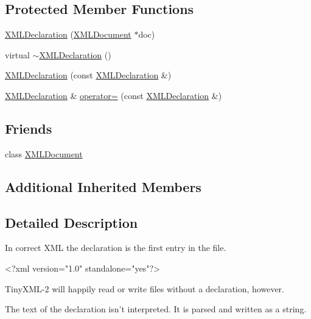\subsection*{Protected Member Functions}
\begin{DoxyCompactItemize}
\item 
\hyperlink{classtinyxml2_1_1_x_m_l_declaration_aef9586f2ce5df5feba74dde49a242b06}{X\-M\-L\-Declaration} (\hyperlink{classtinyxml2_1_1_x_m_l_document}{X\-M\-L\-Document} $\ast$doc)
\item 
virtual \hyperlink{classtinyxml2_1_1_x_m_l_declaration_ab93d5bf4f5d58b4144963cf739cf6dcc}{$\sim$\-X\-M\-L\-Declaration} ()
\item 
\hyperlink{classtinyxml2_1_1_x_m_l_declaration_a5229cc0b31f034f93289af27ec3e2836}{X\-M\-L\-Declaration} (const \hyperlink{classtinyxml2_1_1_x_m_l_declaration}{X\-M\-L\-Declaration} \&)
\item 
\hyperlink{classtinyxml2_1_1_x_m_l_declaration}{X\-M\-L\-Declaration} \& \hyperlink{classtinyxml2_1_1_x_m_l_declaration_a79eb518c2c2b1b99a122a5d5a308b7ee}{operator=} (const \hyperlink{classtinyxml2_1_1_x_m_l_declaration}{X\-M\-L\-Declaration} \&)
\end{DoxyCompactItemize}
\subsection*{Friends}
\begin{DoxyCompactItemize}
\item 
class \hyperlink{classtinyxml2_1_1_x_m_l_declaration_a4eee3bda60c60a30e4e8cd4ea91c4c6e}{X\-M\-L\-Document}
\end{DoxyCompactItemize}
\subsection*{Additional Inherited Members}


\subsection{Detailed Description}
In correct X\-M\-L the declaration is the first entry in the file. \begin{DoxyVerb}    <?xml version="1.0" standalone="yes"?>
\end{DoxyVerb}


Tiny\-X\-M\-L-\/2 will happily read or write files without a declaration, however.

The text of the declaration isn't interpreted. It is parsed and written as a string. 

